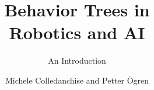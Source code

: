 \documentclass[graybox,envcountchap,sectrefs,12pt]{svmono} %
\begin{document}
\author{Michele Colledanchise and Petter \"Ogren }
\title{Behavior Trees in \\Robotics and AI}
\subtitle{An Introduction}
\date{}%

\maketitle

\frontmatter%
%
%
%
%

\tableofcontents

%


\mainmatter%

















\backmatter%


\printindex

\end{document}
